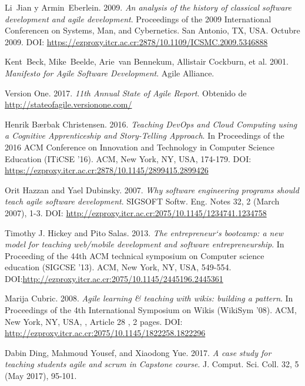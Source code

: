 \begin{thebibliography}{99}

Li~Jian y Armin~Eberlein. 2009. \emph{An analysis of the history of classical software development and agile development}. Proceedings of the 2009 International Conferencen on Systems, Man, and Cybernetics. San Antonio, TX, USA. Octubre 2009. DOI: \url{https://ezproxy.itcr.ac.cr:2878/10.1109/ICSMC.2009.5346888}

Kent~Beck, Mike~Beelde, Arie~van Bennekum, Allistair Cockburn, et al. 2001. \emph{Manifesto for Agile Software Development}. Agile Alliance.

Version One. 2017. \emph{11th Annual State of Agile Report}. Obtenido de \url{http://stateofagile.versionone.com/}

Henrik Bærbak Christensen. 2016. \emph{Teaching DevOps and Cloud Computing using a Cognitive Apprenticeship and Story-Telling Approach}. In Proceedings of the 2016 ACM Conference on Innovation and Technology in Computer Science Education (ITiCSE '16). ACM, New York, NY, USA, 174-179. DOI: \url{https://ezproxy.itcr.ac.cr:2878/10.1145/2899415.2899426}

Orit Hazzan and Yael Dubinsky. 2007. \emph{Why software engineering programs should teach agile software development}. SIGSOFT Softw. Eng. Notes 32, 2 (March 2007), 1-3. DOI: \url{http://ezproxy.itcr.ac.cr:2075/10.1145/1234741.1234758} 

Timothy J. Hickey and Pito Salas. 2013. \emph{The entrepreneur`s bootcamp: a new model for teaching web/mobile development and software entrepreneurship}. In Proceeding of the 44th ACM technical symposium on Computer science education (SIGCSE '13). ACM, New York, NY, USA, 549-554. DOI:\url{http://ezproxy.itcr.ac.cr:2075/10.1145/2445196.2445361}

Marija Cubric. 2008. \emph{Agile learning \& teaching with wikis: building a pattern}. In Proceedings of the 4th International Symposium on Wikis (WikiSym '08). ACM, New York, NY, USA, , Article 28 , 2 pages. DOI: \url{http://ezproxy.itcr.ac.cr:2075/10.1145/1822258.1822296}

Dabin Ding, Mahmoud Yousef, and Xiaodong Yue. 2017. \emph{A case study for teaching students agile and scrum in Capstone course}. J. Comput. Sci. Coll. 32, 5 (May 2017), 95-101.


\end{thebibliography}
